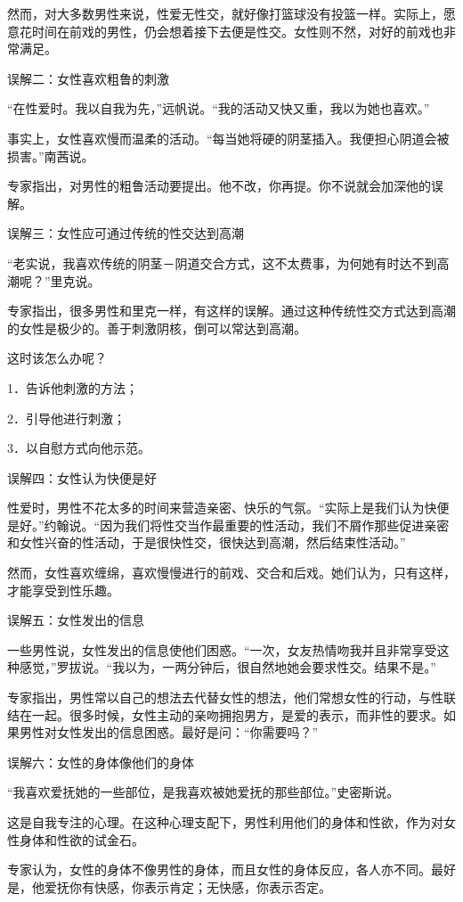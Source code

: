 \documentclass[12pt,UTF8]{ctexbook}
\begin{document}
然而，对大多数男性来说，性爱无性交，就好像打篮球没有投篮一样。实际上，愿意花时间在前戏的男性，仍会想着接下去便是性交。女性则不然，对好的前戏也非常满足。

误解二：女性喜欢粗鲁的刺激

“在性爱时。我以自我为先，”远帆说。“我的活动又快又重，我以为她也喜欢。”

事实上，女性喜欢慢而温柔的活动。“每当她将硬的阴茎插入。我便担心阴道会被损害。”南茜说。

专家指出，对男性的粗鲁活动要提出。他不改，你再提。你不说就会加深他的误解。

误解三：女性应可通过传统的性交达到高潮

“老实说，我喜欢传统的阴茎－阴道交合方式，这不太费事，为何她有时达不到高潮呢？”里克说。

专家指出，很多男性和里克一样，有这样的误解。通过这种传统性交方式达到高潮的女性是极少的。善于刺激阴核，倒可以常达到高潮。

这时该怎么办呢？

1．告诉他刺激的方法；

2．引导他进行刺激；

3．以自慰方式向他示范。

误解四：女性认为快便是好

性爱时，男性不花太多的时间来营造亲密、快乐的气氛。“实际上是我们认为快便是好。”约翰说。“因为我们将性交当作最重要的性活动，我们不屑作那些促进亲密和女性兴奋的性活动，于是很快性交，很快达到高潮，然后结束性活动。”

然而，女性喜欢缠绵，喜欢慢慢进行的前戏、交合和后戏。她们认为，只有这样，才能享受到性乐趣。

误解五：女性发出的信息

一些男性说，女性发出的信息使他们困惑。“一次，女友热情吻我并且非常享受这种感觉，”罗拔说。“我以为，一两分钟后，很自然地她会要求性交。结果不是。”

专家指出，男性常以自己的想法去代替女性的想法，他们常想女性的行动，与性联结在一起。很多时候，女性主动的亲吻拥抱男方，是爱的表示，而非性的要求。如果男性对女性发出的信息困惑。最好是问：“你需要吗？”

误解六：女性的身体像他们的身体

“我喜欢爱抚她的一些部位，是我喜欢被她爱抚的那些部位。”史密斯说。

这是自我专注的心理。在这种心理支配下，男性利用他们的身体和性欲，作为对女性身体和性欲的试金石。

专家认为，女性的身体不像男性的身体，而且女性的身体反应，各人亦不同。最好是，他爱抚你有快感，你表示肯定；无快感，你表示否定。
\end{document}
